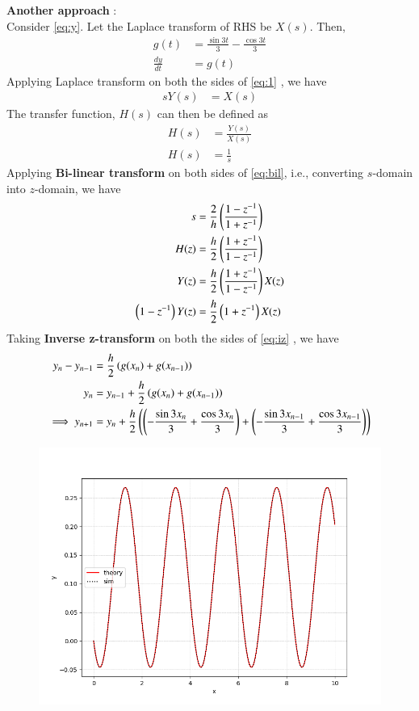 \documentclass[journal,12pt,onecolumn]{IEEEtran}
\theoremstyle{remark}
\begin{document}
\textbf{Another approach} : \\
Consider \eqref{eq:y}. Let the Laplace transform of RHS be $X(s)$. Then, 
\begin{align}
	g(t) &= \frac{\sin3t}{3}-\frac{\cos3t}{3} \\
	\frac{dy}{dt} &= g(t) \label{eq:1}
\end{align}
Applying Laplace transform on both the sides of \eqref{eq:1} , we have 
\begin{align}
	s Y(s) &= X(s) 
\end{align}
The transfer function, $H(s)$ can then be defined as
\begin{align}
	H(s) &= \frac{Y(s)}{X(s)} \\
	H(s) &= \frac{1}{s} \label{eq:bil}
\end{align}
Applying \textbf{Bi-linear transform} on both sides of \eqref{eq:bil}, i.e., converting $s$-domain into $z$-domain, we have
\begin{align}
	s &= \frac{2}{h} \left(\frac{1 - z^{-1}}{1 + z^{-1}}\right) \\
	H(z) &= \frac{h}{2} \left(\frac{1 + z^{-1}}{1 - z^{-1}}\right) \\
	Y(z) &= \frac{h}{2} \left(\frac{1 + z^{-1}}{1 - z^{-1}}\right) X(z) \\
	\left(1 - z^{-1}\right) Y(z) &= \frac{h}{2} \left(1 + z^{-1}\right) X(z) \label{eq:iz} 
\end{align}
Taking \textbf{Inverse z-transform} on both the sides of \eqref{eq:iz} , we have
\begin{align}
	y_{n} - y_{n-1} &= \frac{h}{2} \left(g(x_{n}) + g(x_{n-1})\right) \\
	y_{n} &= y_{n-1} + \frac{h}{2} \left(g(x_{n}) + g(x_{n-1})\right) \label{eq:difeq2}\\
    \implies y_{n+1}&=y_n+\frac{h}{2}\left(\left(-\frac{\sin3x_{n}}{3}+\frac{\cos3x_{n}}{3}\right)+\left(-\frac{\sin3x_{n-1}}{3}+\frac{\cos3x_{n-1}}{3}\right)\right)
\end{align}
\begin{figure}[h]
    \centering
    \includegraphics[width=\columnwidth]{figs/fig.png}
 \end{figure}
\end{document}
